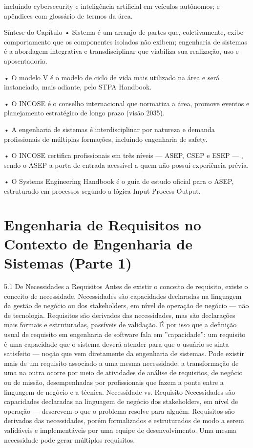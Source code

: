 incluindo cybersecurity e inteligência artificial em veículos autônomos; e apêndices com glossário de termos da área.

Síntese do Capítulo • Sistema é um arranjo de partes que, coletivamente, exibe comportamento que os componentes isolados não exibem; engenharia de sistemas é a abordagem integrativa e transdisciplinar que viabiliza sua realização, uso e aposentadoria.

• O modelo V é o modelo de ciclo de vida mais utilizado na área e será instanciado, mais adiante, pelo STPA Handbook.

• O INCOSE é o conselho internacional que normatiza a área, promove eventos e planejamento estratégico de longo prazo (visão 2035).

• A engenharia de sistemas é interdisciplinar por natureza e demanda profissionais de múltiplas formações, incluindo engenharia de safety.

• O INCOSE certifica profissionais em três níveis — ASEP, CSEP e ESEP — , sendo o ASEP a porta de entrada acessível a quem não possui experiência prévia.

• O Systems Engineering Handbook é o guia de estudo oficial para o ASEP, estruturado em processos segundo a lógica Input-Process-Output.

\chapter{Engenharia de Requisitos no Contexto de Engenharia de Sistemas (Parte 1)}

5.1 De Necessidades a Requisitos Antes de existir o conceito de requisito, existe o conceito de necessidade. Necessidades são capacidades declaradas na linguagem da gestão de negócio ou dos stakeholders, em nível de operação de negócio — não de tecnologia. Requisitos são derivados das necessidades, mas são declarações mais formais e estruturadas, passíveis de validação. É por isso que a definição usual de requisito em engenharia de software fala em ”capacidade”: um requisito é uma capacidade que o sistema deverá atender para que o usuário se sinta satisfeito — noção que vem diretamente da engenharia de sistemas. Pode existir mais de um requisito associado a uma mesma necessidade; a transformação de uma na outra ocorre por meio de atividades de análise de requisitos, de negócio ou de missão, desempenhadas por profissionais que fazem a ponte entre a linguagem de negócio e a técnica. Necessidade vs. Requisito Necessidades são capacidades declaradas na linguagem de negócio dos stakeholders, em nível de operação — descrevem o que o problema resolve para alguém. Requisitos são derivados das necessidades, porém formalizados e estruturados de modo a serem validáveis e implementáveis por uma equipe de desenvolvimento. Uma mesma necessidade pode gerar múltiplos requisitos.

